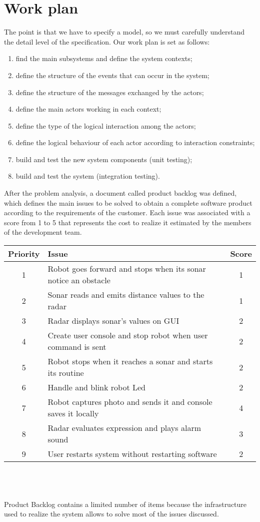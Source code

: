 \section{Work plan}
The point is that we have to specify a model, so we must carefully understand the detail level of the specification.
Our work plan is set as follows:
\begin{enumerate}
	\item find the main subsystems and define the system contexts;
	\item define the structure of the events that can occur in the system;
	\item define the structure of the messages exchanged by the actors;
	\item define the main actors working in each context;
	\item define the type of the logical interaction among the actors;
	\item define the logical behaviour of each actor according to interaction constraints;
	\item build and test the new system components (unit testing);
	\item build and test the system (integration testing).
\end{enumerate}
After the problem analysis, a document called product backlog was defined, which defines the main issues to be solved to obtain a complete software product according to the requirements of the customer. Each issue was associated with a score from 1 to 5 that represents the cost to realize it  estimated by the members of the development team.\\
\begin{minipage}{\linewidth}
\centering
{} \label{tab:title} 
\end{minipage}
\begin{tabular}{| c | p{9.5cm} | c |}
\hline
\textbf{Priority} & \textbf{Issue} &  \textbf{Score}\\ \hline
1 & Robot goes forward and stops when its sonar notice an obstacle & 1 \\  \hline
2 & Sonar reads and emits distance values to the radar & 1 \\  \hline
3 & Radar displays sonar's values on GUI & 2 \\  \hline
4 & Create user console and stop robot when user command is sent & 2 \\ \hline
5 & Robot stops when it reaches a sonar and starts its routine & 2 \\  \hline
6 & Handle and blink robot Led &  2 \\ \hline
7 & Robot captures photo and sends it and console saves it locally & 4 \\ \hline
8 & Radar evaluates expression and plays alarm sound & 3 \\ \hline
9 & User restarts system without restarting software & 2 \\
\hline
\end{tabular}
\\\\\\
Product Backlog contains a limited number of items because the infrastructure used to realize the system allows to solve most of the issues discussed.